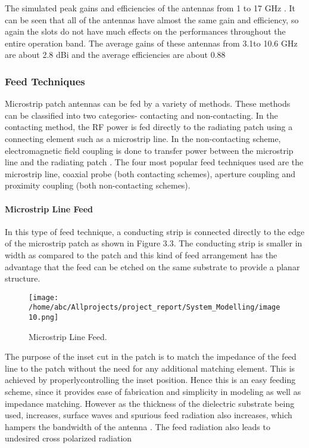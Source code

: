 \documentclass[12pt]{article}
\begin{document}
				                
				                 The simulated peak gains and efficiencies of the antennas from 1 to 17 GHz . It can be seen that all of the antennas have almost the same gain and efficiency, so again the slots do not have much effects on the performances throughout the entire operation band. The average gains of these antennas from 3.1to 10.6 GHz are about 2.8 dBi and the average efficiencies are about 0.88
				                 
				                \subsubsection{Feed Techniques}
				                  \justify
				                   Microstrip patch antennas can be fed by a variety of methods. These methods can be
				                   classified into two categories- contacting and non-contacting. In the contacting method, the RF power is fed directly to the radiating patch using a connecting element such as a microstrip line. In the non-contacting scheme, electromagnetic field coupling is done to transfer power between the microstrip line and the radiating patch . The four most popular feed techniques used are the microstrip line, coaxial probe (both contacting schemes), aperture coupling and proximity coupling (both non-contacting schemes).
				                 \paragraph{ Microstrip Line Feed}
				                   \justify
				                    In this type of feed technique, a conducting strip is connected directly to the edge of the microstrip patch as shown in Figure 3.3. The conducting strip is smaller in width as compared to the patch and this kind of feed arrangement has the advantage that the feed can be etched on the same substrate to provide a planar structure.
				                    
				                    \begin{figure}[H]
				                    	\centering
				                    	\texttt{[image: /home/abc/Allprojects/project\_report/System\_Modelling/image10.png]}
				                    	\caption{Microstrip Line Feed.}	             	
				                    \end{figure}
				                    
				                    
					               	The purpose of the inset cut in the patch is to match the impedance of the feed line to the patch without the need for any additional matching element. This is achieved by properlycontrolling the inset position. Hence this is an easy feeding scheme, since it provides ease of fabrication and simplicity in modeling as well as impedance matching. However as the thickness of the dielectric substrate being used, increases, surface waves and spurious feed radiation also increases, which hampers the bandwidth of the antenna . The feed radiation also leads to undesired cross polarized radiation
\end{document}
